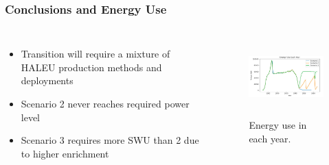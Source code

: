 \begin{frame}
        \frametitle{Conclusions and Energy Use}
              \begin{columns}
                      \column[t]{5cm}
                        \begin{itemize}
                                \item Transition will require a mixture of HALEU production methods and deployments
                                \item Scenario 2 never reaches required power level
                                \item Scenario 3 requires more SWU than 2 due to higher enrichment
                        \end{itemize}
                      \column[t]{5cm}
              \begin{figure}[htbp!]
              \begin{center}
            \includegraphics[height=3cm]{./images/e_use.png}
          \end{center}
                \caption{Energy use in each year.}
          \label{fig:e_use}
        \end{figure}
              \end{columns}
\end{frame}
